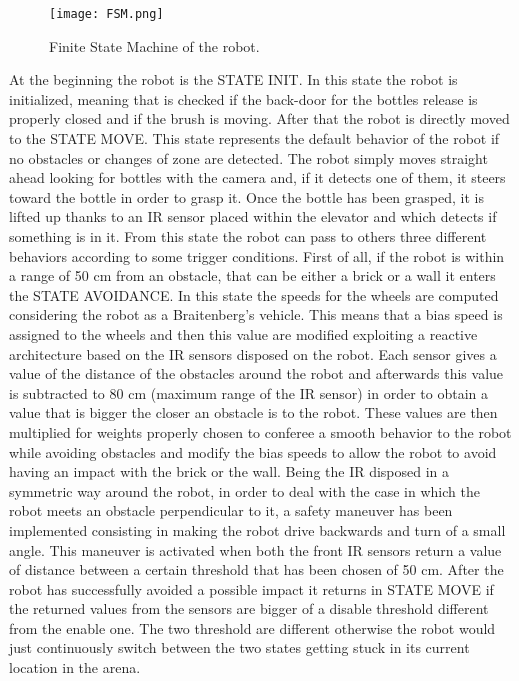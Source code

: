 \begin{figure}
\centering
\texttt{[image: FSM.png]}
\caption{Finite State Machine of the robot.}
\label{fig:FSM}
\end{figure}

At the beginning the robot is the STATE INIT. In this state the robot is initialized, meaning that is checked if the back-door for the bottles release is properly closed and if the brush is moving.
After that the robot is directly moved to the STATE MOVE.
This state represents the default behavior of the robot if no obstacles or changes of zone are detected.
The robot simply moves straight ahead looking for bottles with the camera and, if it detects one of them, it steers toward the bottle in order to grasp it.
Once the bottle has been grasped, it is lifted up thanks to an IR sensor placed within the elevator and which detects if something is in it.
From this state the robot can pass to others three different behaviors according to some trigger conditions.
First of all, if the robot is within a range of 50 cm from an obstacle, that can be either a brick or a wall it enters the STATE AVOIDANCE.
In this state the speeds for the wheels are computed considering the robot as a Braitenberg's vehicle.
This means that a bias speed is assigned to the wheels and then this value are modified exploiting a reactive architecture based on the IR sensors disposed on the robot.
Each sensor gives a value of the distance of the obstacles around the robot and afterwards this value is subtracted to 80 cm (maximum range of the IR sensor) in order to obtain a value that is bigger the closer an obstacle is to the robot. These values are then multiplied for weights properly chosen to conferee a smooth behavior to the robot while avoiding obstacles and modify the bias speeds to allow the robot to avoid having an impact with the brick or the wall.
Being the IR disposed in a symmetric way around the robot, in order to deal with the case in which the robot meets an obstacle perpendicular to it, a safety maneuver has been implemented consisting in making the robot drive backwards and turn of a small angle. This maneuver is activated when both the front IR sensors return a value of distance between a certain threshold that has been chosen of 50 cm.
After the robot has successfully avoided a possible impact it returns in STATE MOVE if the returned values from the sensors are bigger of a disable threshold different from the enable one. The two threshold are different otherwise the robot would just continuously switch between the two states getting stuck in its current location in the arena.
